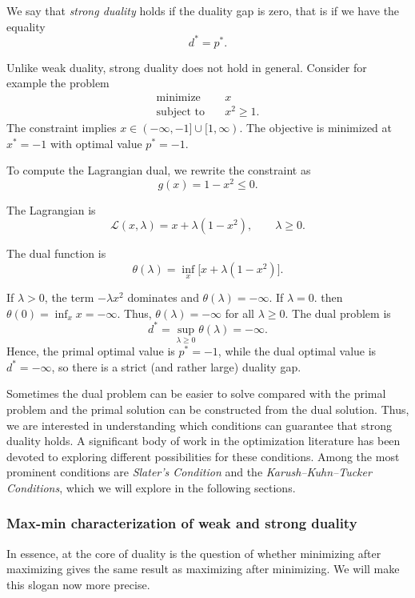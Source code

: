 We say that {\em strong duality} holds if the duality gap is zero, that is if we have the equality
\begin{equation}
 \label{strongduality}   
d^* = p^*.
\end{equation}

Unlike weak duality, strong duality does not hold in general.  Consider for example the problem
\begin{align*}
\text{minimize}  & \quad  x \\
\text{subject to} & \quad x^2 \ge 1.
\end{align*}
The constraint implies
$
x \in (-\infty,-1] \cup [1,\infty)$.
The objective is minimized at
$x^* = -1$ with optimal value $p^* = -1$.

To compute the Lagrangian dual, we rewrite the constraint as
$$
g(x) = 1 - x^2 \le 0.
$$

The Lagrangian is
$$
\mathcal{L}(x,\lambda) = x + \lambda(1 - x^2),
\qquad \lambda \ge 0.
$$

The dual function is
$$
\theta(\lambda) = \inf_x \big[ x + \lambda(1 - x^2) \big].
$$

If $\lambda > 0$, the term $-\lambda x^2$ dominates and
  $\theta(\lambda) = -\infty$.
If $\lambda = 0$. then $\theta(0) = \inf_{x} x = -\infty$.
Thus, $\theta(\lambda) = -\infty$ for all $\lambda \ge 0$.
The dual problem is
$$
d^* = \sup_{\lambda \ge 0} \theta(\lambda) = -\infty.
$$
Hence, the primal optimal value is $p^* = -1$, while
the dual optimal value is $d^* = -\infty$,
so there is a  strict (and rather large) duality gap.

\medskip


Sometimes the dual problem can be easier to solve compared with the primal problem and the primal solution can be constructed from the dual solution.
Thus, we are interested in understanding which conditions can guarantee that 
strong duality holds. A significant body of work in the optimization literature has been devoted to exploring 
different possibilities for these conditions. Among the most prominent conditions are {\em Slater's Condition} and the 
{\em Karush–Kuhn–Tucker Conditions}, which we will explore in the following sections.

\subsubsection{Max-min characterization of weak and strong duality}\label{ss:minmax}

In essence, at the core of duality is the question of whether minimizing after maximizing gives the same result as maximizing after minimizing. We will make this slogan now more precise.

